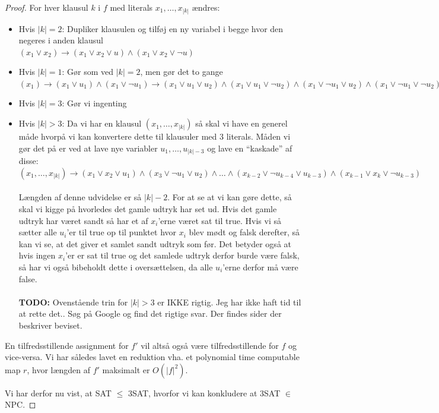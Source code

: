 \begin{proof}
For hver klausul $k$ i $f$ med literals $x_1, \hdots, x_{|k|}$ ændres:
\begin{itemize}
 \item Hvis $|k| = 2$: Dupliker klausulen og tilføj en ny variabel i begge hvor den negeres i anden klausul \\
      $(x_1 \vee x_2) \rightarrow (x_1 \vee x_2 \vee u) \wedge (x_1 \vee x_2 \vee \neg u)$
 \item Hvis $|k| = 1$: Gør som ved $|k| = 2$, men gør det to gange \\
      $(x_1) \rightarrow (x_1 \vee u_1) \wedge (x_1 \vee \neg u_1) \rightarrow (x_1 \vee u_1 \vee u_2) \wedge (x_1 \vee u_1 \vee \neg u_2) \wedge (x_1 \vee \neg u_1 \vee u_2) \wedge (x_1 \vee \neg u_1 \vee \neg u_2)$
 \item Hvis $|k| = 3$: Gør vi ingenting
 \item Hvis $|k| > 3$: Da vi har en klausul $(x_1,\hdots,x_{|k|})$ så skal vi have en generel måde hvorpå vi kan konvertere dette til klausuler med 3 literals. Måden vi gør det på er ved at lave nye variabler $u_1,\hdots,u_{|k|-3}$ og lave en ``kaskade'' af disse:\\
      $(x_1,\hdots,x_{|k|}) \rightarrow (x_1 \vee x_2 \vee u_1) \wedge (x_3 \vee \neg u_1 \vee u_2) \wedge \hdots \wedge (x_{k-2} \vee \neg u_{k-4} \vee u_{k-3}) \wedge (x_{k-1} \vee x_k \vee \neg u_{k-3})$ \\
      ~\\
      Længden af denne udvidelse er så $|k|-2$.
      For at se at vi kan gøre dette, så skal vi kigge på hvorledes det gamle udtryk har set ud. Hvis det gamle udtryk har været sandt så har et af $x_i$'erne været sat til true. Hvis vi så sætter alle $u_i$'er til true op til punktet hvor $x_i$ blev mødt og falsk derefter, så kan vi se, at det giver et samlet sandt udtryk som før. Det betyder også at hvis ingen $x_i$'er er sat til true og det samlede udtryk derfor burde være falsk, så har vi også bibeholdt dette i oversættelsen, da alle $u_i$'erne derfor må være false.\\
      ~\\
      \textbf{TODO:} Ovenstående trin for $|k| > 3$ er IKKE rigtig. Jeg har ikke haft tid til at rette det.. Søg på Google og find det rigtige svar. Der findes sider der beskriver beviset.
\end{itemize}

En tilfredsstillende assignment for $f'$ vil altså også være tilfredsstillende for $f$ og vice-versa. Vi har således lavet en reduktion vha. et polynomial time computable map $r$, hvor længden af $f'$ maksimalt er $O(|f|^2)$.

Vi har derfor nu vist, at SAT $\leq$ 3SAT, hvorfor vi kan konkludere at 3SAT $\in$ NPC.
\end{proof}


